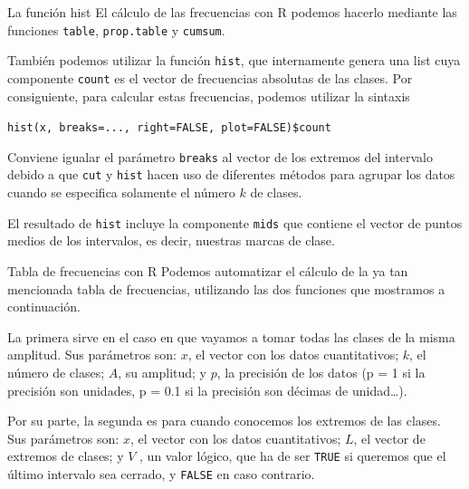 \documentclass[
  ignorenonframetext,
  aspectratio=169]{beamer}
\begin{document}
\begin{frame}[fragile]{La función hist}
\label{la-funciuxf3n-hist-1}
El cálculo de las frecuencias con R podemos hacerlo mediante las
funciones \texttt{table}, \texttt{prop.table} y \texttt{cumsum}.

También podemos utilizar la función \texttt{hist}, que internamente
genera una list cuya componente \texttt{count} es el vector de
frecuencias absolutas de las clases. Por consiguiente, para calcular
estas frecuencias, podemos utilizar la sintaxis

\texttt{hist(x,\ breaks=...,\ right=FALSE,\ plot=FALSE)\$count}

Conviene igualar el parámetro \texttt{breaks} al vector de los extremos
del intervalo debido a que \texttt{cut} y \texttt{hist} hacen uso de
diferentes métodos para agrupar los datos cuando se especifica solamente
el número \(k\) de clases.

El resultado de \texttt{hist} incluye la componente \texttt{mids} que
contiene el vector de puntos medios de los intervalos, es decir,
nuestras marcas de clase.
\end{frame}

\begin{frame}[fragile]{Tabla de frecuencias con R}
\label{tabla-de-frecuencias-con-r}
Podemos automatizar el cálculo de la ya tan mencionada tabla de
frecuencias, utilizando las dos funciones que mostramos a continuación.

La primera sirve en el caso en que vayamos a tomar todas las clases de
la misma amplitud. Sus parámetros son: \(x\), el vector con los datos
cuantitativos; \(k\), el número de clases; \(A\), su amplitud; y \(p\),
la precisión de los datos (p = 1 si la precisión son unidades, p = 0.1
si la precisión son décimas de unidad\ldots).

Por su parte, la segunda es para cuando conocemos los extremos de las
clases. Sus parámetros son: \(x\), el vector con los datos
cuantitativos; \(L\), el vector de extremos de clases; y \(V\) , un
valor lógico, que ha de ser \texttt{TRUE} si queremos que el último
intervalo sea cerrado, y \texttt{FALSE} en caso contrario.
\end{frame}
\end{document}
